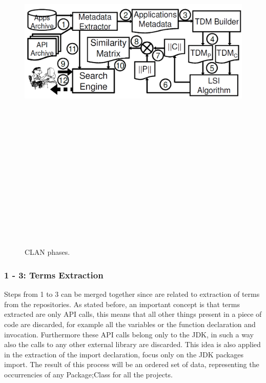 \begin{figure}[H]
\includegraphics[width=15cm,height=20cm,keepaspectratio]{images/Clan.png}
\centering
\caption{CLAN phases.}
\end{figure}

\subsubsection{1 - 3: Terms Extraction}
Steps from 1 to 3 can be merged together since are related to extraction of terms from the repositories.
As stated before, an important concept is that terms extracted are only API calls, this means that all other things present in a piece of code are discarded, for example all the variables or the function declaration and invocation. Furthermore these API calls belong only to the JDK, in such a way also the calls to any other external library are discarded. This idea is also applied in the extraction of the import declaration, focus only on the JDK packages import.
The result of this process will be an ordered set of data, representing the occurrencies of any Package;Class for all the projects.

